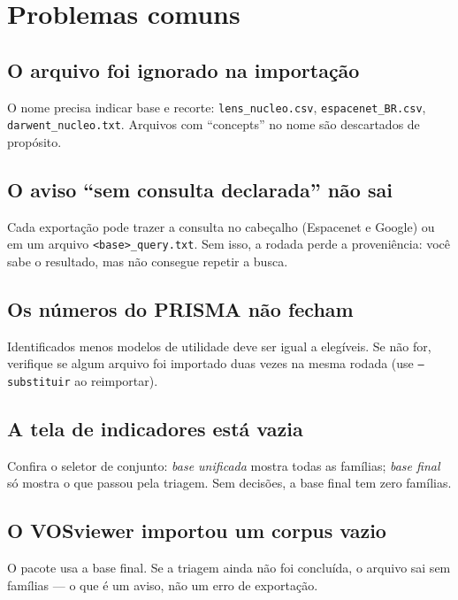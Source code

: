 \documentclass[11pt,a4paper]{article}
\newcommand{\campo}[1]{\texttt{\small #1}}
\begin{document}
\section{Problemas comuns}
\label{sec:problemas}

\subsection*{O arquivo foi ignorado na importação}
O nome precisa indicar base e recorte: \campo{lens\_nucleo.csv}, \campo{espacenet\_BR.csv},
\campo{darwent\_nucleo.txt}. Arquivos com ``concepts'' no nome são descartados de propósito.

\subsection*{O aviso ``sem consulta declarada'' não sai}
Cada exportação pode trazer a consulta no cabeçalho (Espacenet e Google) ou em um arquivo
\campo{<base>\_query.txt}. Sem isso, a rodada perde a proveniência: você sabe o resultado, mas não
consegue repetir a busca.

\subsection*{Os números do PRISMA não fecham}
Identificados menos modelos de utilidade deve ser igual a elegíveis. Se não for, verifique se algum
arquivo foi importado duas vezes na mesma rodada (use \campo{--substituir} ao reimportar).

\subsection*{A tela de indicadores está vazia}
Confira o seletor de conjunto: \emph{base unificada} mostra todas as famílias; \emph{base final} só
mostra o que passou pela triagem. Sem decisões, a base final tem zero famílias.

\subsection*{O VOSviewer importou um corpus vazio}
O pacote usa a base final. Se a triagem ainda não foi concluída, o arquivo sai sem famílias --- o que
é um aviso, não um erro de exportação.
\end{document}
